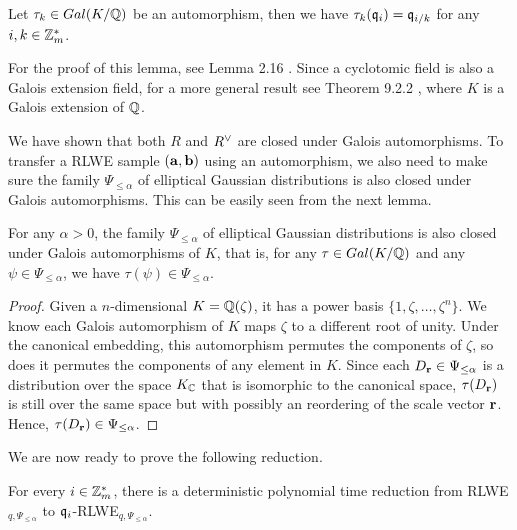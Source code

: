 \documentclass[../main.tex]{subfiles}
\begin{document}
\begin{lemma}
\reversemarginpar
{}
Let $\tau_k \in Gal(K/\mathbb{Q})$ be an automorphism, then we have $\tau_k(\mathfrak{q}_i)=\mathfrak{q}_{i/k}$ for any $i, k \in \mathbb{Z}_m^*$.
\end{lemma}

For the proof of this lemma, see Lemma 2.16 \cite{lyubashevsky2010ideal}. Since a cyclotomic field is also a Galois extension field, for a more general result see Theorem 9.2.2 \cite{stein2012algebraic}, where $K$ is a Galois extension of $\mathbb{Q}$.

We have shown that both $R$ and $R^{\vee}$ are closed under Galois automorphisms. To transfer a RLWE sample $(\mathbf{a},\mathbf{b})$ using an automorphism, we also need to make sure the family $\Psi_{\le \alpha}$ of elliptical Gaussian distributions is also closed under Galois automorphisms. This can be easily seen from the next lemma. 

\begin{lemma}
\reversemarginpar
{}
For any $\alpha>0$, the family $\Psi_{\le \alpha}$ of elliptical Gaussian distributions is also closed under Galois automorphisms of $K$, that is, for any $\tau \in Gal(K/\mathbb{Q})$ and any $\psi \in \Psi_{\le \alpha}$, we have $\tau(\psi) \in \Psi_{\le \alpha}$.
\end{lemma}

\begin{proof}
Given a $n$-dimensional $K=\mathbb{Q}(\zeta)$, it has a power basis $\{1, \zeta, \dots, \zeta^n\}$. We know each Galois automorphism of $K$ maps $\zeta$ to a different root of unity. Under the canonical embedding, this automorphism permutes the components of $\zeta$, so does it permutes the components of any element in $K$. Since each $D_{\mathbf{r}} \in \Psi_{\le \alpha}$ is a distribution over the space $K_{\mathbb{C}}$ that is isomorphic to the canonical space, $\tau(D_{\mathbf{r}})$ is still over the same space but with possibly an reordering of the scale vector $\mathbf{r}$. Hence, $\tau(D_{\mathbf{r}}) \in \Psi_{\le \alpha}$. 
\end{proof}

We are now ready to prove the following reduction. 

\begin{lemma}
\label{lm:rlweRed1}
\reversemarginpar
{}
For every $i \in \mathbb{Z}_m^*$, there is a deterministic polynomial time reduction from RLWE$_{q,\Psi_{\le \alpha}}$ to $\mathfrak{q}_i$-RLWE$_{q,\Psi_{\le \alpha}}$.
\end{lemma}
\end{document}
